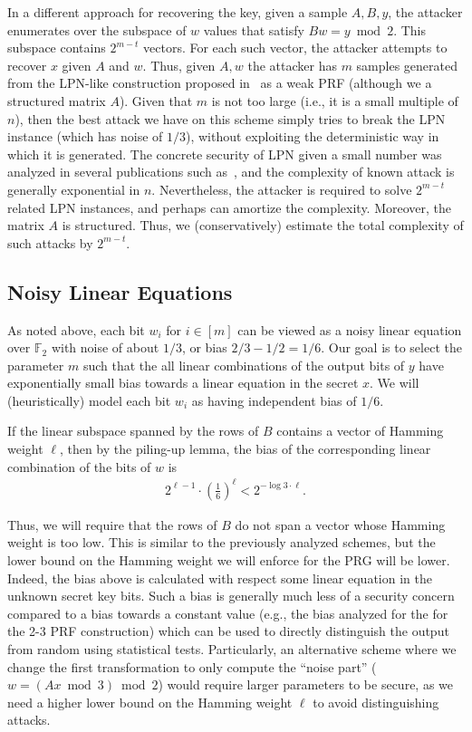 \documentclass[orivec,envcountsect]{llncs}
\begin{document}
In a different approach for recovering the key, given a sample $A,B,y$,
the attacker enumerates over the subspace of $w$ values that satisfy $B w = y \bmod 2$.
This subspace contains $2^{m - t}$ vectors. For each such vector, the attacker attempts to recover $x$
given $A$ and $w$. Thus, given $A,w$ the attacker has $m$ samples
generated from the LPN-like construction proposed in~\cite{BonehIPSW18} as a weak PRF
(although we a structured matrix $A$).
Given that $m$ is not too large (i.e., it is a small multiple of $n$),
then the best attack we have on this scheme simply tries to break the LPN instance (which has noise of $1/3$),
without exploiting the deterministic way in which it is generated.
The concrete security of LPN given a small number was analyzed in several publications such as~\cite{EsserKM17},
and the complexity of known attack is generally exponential in $n$.
Nevertheless, the attacker is required to solve $2^{m - t}$ related LPN instances,
and perhaps can amortize the complexity. Moreover, the matrix $A$ is structured.
Thus, we (conservatively) estimate the total complexity of such attacks by $2^{m - t}$.

\subsection{Noisy Linear Equations}

As noted above, each bit $w_i$ for $i \in [m]$ can be viewed as a noisy linear equation over $\mathbb{F}_2$
with noise of about $1/3$, or bias $2/3 - 1/2 = 1/6$.
Our goal is to select the parameter $m$ such that
the all linear combinations of the output bits of $y$
have exponentially small bias towards a linear equation in the secret $x$.
We will (heuristically) model each bit $w_i$ as having independent bias of $1/6$.

If the linear subspace spanned by the rows of $B$ contains a vector of Hamming weight $\ell$,
then by the piling-up lemma, the bias of the corresponding linear combination of the bits of $w$ is
\begin{align}\label{eq:bias_linear}
2^{\ell - 1} \cdot (\tfrac{1}{6})^{\ell} < 2^{-\log 3 \cdot \ell}.
\end{align}

Thus, we will require
that the rows of $B$ do not span a vector whose Hamming weight is too low.
This is similar to the previously analyzed schemes,
but the lower bound on the Hamming weight we will enforce for the PRG will be lower.
Indeed, the bias above is calculated with respect some linear equation in the unknown secret key bits.
Such a bias is generally much less of a security concern compared to a bias towards a constant value
(e.g., the bias analyzed for the for the 2-3 PRF construction) which can be used
to directly distinguish the output from random using statistical tests.
Particularly, an alternative scheme where we change the first transformation
to only compute the ``noise part''
($w =(Ax \bmod 3) \bmod 2$) would require larger parameters to be secure,
as we need a higher lower bound on the Hamming weight $\ell$ to avoid distinguishing attacks.
\end{document}
